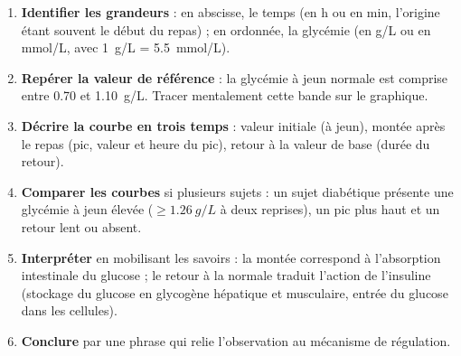 \documentclass[11pt]{article}
\newcommand{\cle}[1]{{\popxbold\color{popdark}#1}}
\begin{document}
\begin{methode}
\begin{enumerate}
\item \textbf{Identifier les grandeurs} : en abscisse, le temps (en h ou en min, l'origine étant souvent le début du repas) ; en ordonnée, la glycémie (en g/L ou en mmol/L, avec \SI{1}{g/L} = \SI{5,5}{mmol/L}).
\item \textbf{Repérer la valeur de référence} : la glycémie à jeun normale est comprise entre \num{0,70} et \SI{1,10}{g/L}. Tracer mentalement cette bande sur le graphique.
\item \textbf{Décrire la courbe en trois temps} : valeur initiale (à jeun), montée après le repas (pic, valeur et heure du pic), retour à la valeur de base (durée du retour).
\item \textbf{Comparer les courbes} si plusieurs sujets : un sujet diabétique présente une glycémie à jeun élevée ($\geq \SI{1,26}{g/L}$ à deux reprises), un pic plus haut et un retour lent ou absent.
\item \textbf{Interpréter} en mobilisant les savoirs : la montée correspond à l'absorption intestinale du glucose ; le retour à la normale traduit l'action de l'\cle{insuline} (stockage du glucose en glycogène hépatique et musculaire, entrée du glucose dans les cellules).
\item \textbf{Conclure} par une phrase qui relie l'observation au mécanisme de régulation.
\end{enumerate}
\end{methode}
\end{document}
